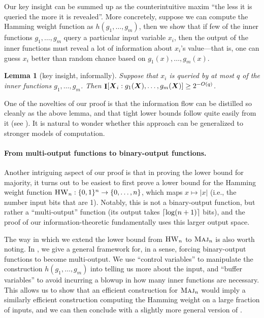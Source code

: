 \documentclass[10pt,a4paper]{article}
\newtheorem{lemma}{Lemma}[section]
\theoremstyle{definition}
\theoremstyle{remark}
\newcommand{\mathsc}[1]{{\normalfont\textsc{#1}}}
\DeclarePairedDelimiter{\ceil}{\lceil}{\rceil}
\DeclarePairedDelimiter{\set}{\{}{\}}
\DeclarePairedDelimiter{\sqb}{[}{]}
\DeclareMathOperator{\I}{\mathbf{I}}
\DeclareMathOperator{\Maj}{\mathsc{Maj}}
\DeclareMathOperator{\HW}{\mathsc{HW}}
\newcommand{\bX}{\boldsymbol{X}}
\newcommand{\zo}{\set{0,1}}
\begin{document}
Our key insight can be summed up as the counterintuitive maxim ``the less it is queried the more it is revealed''.
More concretely, suppose we can compute the Hamming weight function as $h(g_1, \ldots ,g_m)$, then we show that
if few of the inner functions $g_1, \ldots, g_m$ query a particular input variable $x_i$, then the output of the inner functions must reveal a lot of information about $x_i$'s value---that is, one can guess $x_i$ better than random chance based on $g_1(x), \ldots, g_m(x)$.

\begin{lemma}[key insight, informally]
\label{lemma:insight}
Suppose that $x_i$ is queried by at most $q$ of the inner functions $g_1, \ldots, g_m$.
Then $\I\sqb{\bX_i:g_1(\bX), \ldots, g_m(\bX)} \geq 2^{-O(q)}$.
\end{lemma}

One of the novelties of our proof is that the information flow can be distilled so cleanly as the above lemma, and that tight lower bounds follow quite easily from it (see ).
It is natural to wonder whether this approach can be generalized to stronger models of computation.


\paragraph*{From multi-output functions to binary-output functions.}
Another intriguing aspect of our proof is that in
 proving the lower bound for majority,
it turns out to be easiest to first prove a lower bound for the Hamming weight function $\HW_n: \zo^n\to \set{0, \ldots, n}$, which maps $x \mapsto |x|$ (i.e., the number input bits that are 1).
Notably, this is not a binary-output function, but rather a ``multi-output'' function (its output takes $\ceil{\log (n+1)}$ bits), and the proof of our information-theoretic  fundamentally uses this larger output space.

The way in which we extend the lower bound from $\HW_n$ to $\Maj_n$ is also worth noting.
In , we give a general framework for, in a sense, forcing binary-output functions to become multi-output.
We use ``control variables'' to manipulate the construction $h(g_1, \ldots, g_m)$ into telling us more about the input, and ``buffer variables'' to avoid incurring a blowup in how many inner functions are necessary.
This allows us to show that an efficient construction for $\Maj_n$ would imply a similarly efficient construction computing the Hamming weight on a large fraction of inputs, and we can then conclude with a slightly more general version of .
\end{document}
